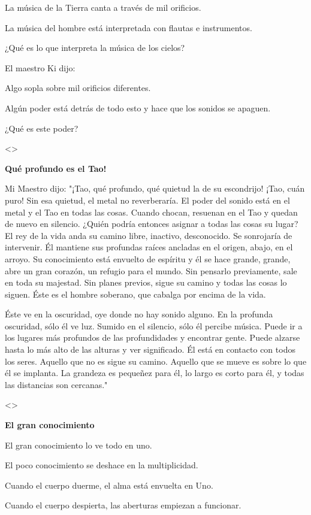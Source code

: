 La música de la Tierra canta a través de mil orificios.

La música del hombre está interpretada con flautas e instrumentos.

¿Qué es lo que interpreta la música de los cielos?

El maestro Ki dijo:

Algo sopla sobre mil orificios diferentes.

Algún poder está detrás de todo esto y hace que los sonidos se apaguen.

¿Qué es este poder?

\textless\textgreater{}

\textbf{{Qué profundo es el Tao!}}

Mi Maestro dijo: "¡Tao, qué profundo, qué quietud la de su escondrijo!
¡Tao, cuán puro! Sin esa quietud, el metal no reverberaría. El poder del
sonido está en el metal y el Tao en todas las cosas. Cuando chocan,
resuenan en el Tao y quedan de nuevo en silencio. ¿Quién podría entonces
asignar a todas las cosas su lugar? El rey de la vida anda su camino
libre, inactivo, desconocido. Se sonrojaría de intervenir. Él mantiene
sus profundas raíces ancladas en el origen, abajo, en el arroyo. Su
conocimiento está envuelto de espíritu y él se hace grande, grande, abre
un gran corazón, un refugio para el mundo. Sin pensarlo previamente,
sale en toda su majestad. Sin planes previos, sigue su camino y todas
las cosas lo siguen. Éste es el hombre soberano, que cabalga por encima
de la vida.

Éste ve en la oscuridad, oye donde no hay sonido alguno. En la profunda
oscuridad, sólo él ve luz. Sumido en el silencio, sólo él percibe
música. Puede ir a los lugares más profundos de las profundidades y
encontrar gente. Puede alzarse hasta lo más alto de las alturas y ver
significado. Él está en contacto con todos los seres. Aquello que no es
sigue su camino. Aquello que se mueve es sobre lo que él se implanta. La
grandeza es pequeñez para él, lo largo es corto para él, y todas las
distancias son cercanas."

\textless\textgreater{}

\textbf{{El gran conocimiento}}

El gran conocimiento lo ve todo en uno.

El poco conocimiento se deshace en la multiplicidad.

Cuando el cuerpo duerme, el alma está envuelta en Uno.

Cuando el cuerpo despierta, las aberturas empiezan a funcionar.

